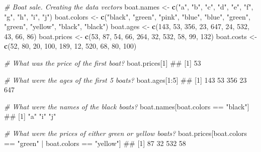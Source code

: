 \documentclass[]{book}
\newenvironment{Shaded}{\begin{snugshade}}{\end{snugshade}}
\newcommand{\KeywordTok}[1]{\textcolor[rgb]{0.13,0.29,0.53}{\textbf{{#1}}}}
\newcommand{\DecValTok}[1]{\textcolor[rgb]{0.00,0.00,0.81}{{#1}}}
\newcommand{\StringTok}[1]{\textcolor[rgb]{0.31,0.60,0.02}{{#1}}}
\newcommand{\CommentTok}[1]{\textcolor[rgb]{0.56,0.35,0.01}{\textit{{#1}}}}
\newcommand{\NormalTok}[1]{{#1}}
\theoremstyle{definition}
\theoremstyle{definition}
\theoremstyle{remark}
\begin{document}
\begin{Shaded}
\begin{Highlighting}[]
\CommentTok{# Boat sale. Creating the data vectors}
\NormalTok{boat.names <-}\StringTok{ }\KeywordTok{c}\NormalTok{(}\StringTok{"a"}\NormalTok{, }\StringTok{"b"}\NormalTok{, }\StringTok{"c"}\NormalTok{, }\StringTok{"d"}\NormalTok{, }\StringTok{"e"}\NormalTok{, }\StringTok{"f"}\NormalTok{, }\StringTok{"g"}\NormalTok{, }\StringTok{"h"}\NormalTok{, }\StringTok{"i"}\NormalTok{, }\StringTok{"j"}\NormalTok{)}
\NormalTok{boat.colors <-}\StringTok{ }\KeywordTok{c}\NormalTok{(}\StringTok{"black"}\NormalTok{, }\StringTok{"green"}\NormalTok{, }\StringTok{"pink"}\NormalTok{, }\StringTok{"blue"}\NormalTok{, }\StringTok{"blue"}\NormalTok{, }
                \StringTok{"green"}\NormalTok{, }\StringTok{"green"}\NormalTok{, }\StringTok{"yellow"}\NormalTok{, }\StringTok{"black"}\NormalTok{, }\StringTok{"black"}\NormalTok{)}
\NormalTok{boat.ages <-}\StringTok{ }\KeywordTok{c}\NormalTok{(}\DecValTok{143}\NormalTok{, }\DecValTok{53}\NormalTok{, }\DecValTok{356}\NormalTok{, }\DecValTok{23}\NormalTok{, }\DecValTok{647}\NormalTok{, }\DecValTok{24}\NormalTok{, }\DecValTok{532}\NormalTok{, }\DecValTok{43}\NormalTok{, }\DecValTok{66}\NormalTok{, }\DecValTok{86}\NormalTok{)}
\NormalTok{boat.prices <-}\StringTok{ }\KeywordTok{c}\NormalTok{(}\DecValTok{53}\NormalTok{, }\DecValTok{87}\NormalTok{, }\DecValTok{54}\NormalTok{, }\DecValTok{66}\NormalTok{, }\DecValTok{264}\NormalTok{, }\DecValTok{32}\NormalTok{, }\DecValTok{532}\NormalTok{, }\DecValTok{58}\NormalTok{, }\DecValTok{99}\NormalTok{, }\DecValTok{132}\NormalTok{)}
\NormalTok{boat.costs <-}\StringTok{ }\KeywordTok{c}\NormalTok{(}\DecValTok{52}\NormalTok{, }\DecValTok{80}\NormalTok{, }\DecValTok{20}\NormalTok{, }\DecValTok{100}\NormalTok{, }\DecValTok{189}\NormalTok{, }\DecValTok{12}\NormalTok{, }\DecValTok{520}\NormalTok{, }\DecValTok{68}\NormalTok{, }\DecValTok{80}\NormalTok{, }\DecValTok{100}\NormalTok{)}

\CommentTok{# What was the price of the first boat?}
\NormalTok{boat.prices[}\DecValTok{1}\NormalTok{]}
\NormalTok{## [1] 53}

\CommentTok{# What were the ages of the first 5 boats?}
\NormalTok{boat.ages[}\DecValTok{1}\NormalTok{:}\DecValTok{5}\NormalTok{]}
\NormalTok{## [1] 143  53 356  23 647}

\CommentTok{# What were the names of the black boats?}
\NormalTok{boat.names[boat.colors ==}\StringTok{ "black"}\NormalTok{]}
\NormalTok{## [1] "a" "i" "j"}

\CommentTok{# What were the prices of either green or yellow boats?}
\NormalTok{boat.prices[boat.colors ==}\StringTok{ "green"} \NormalTok{|}\StringTok{ }\NormalTok{boat.colors ==}\StringTok{ "yellow"}\NormalTok{]}
\NormalTok{## [1]  87  32 532  58}


\end{Highlighting}
\end{Shaded}
\end{document}

